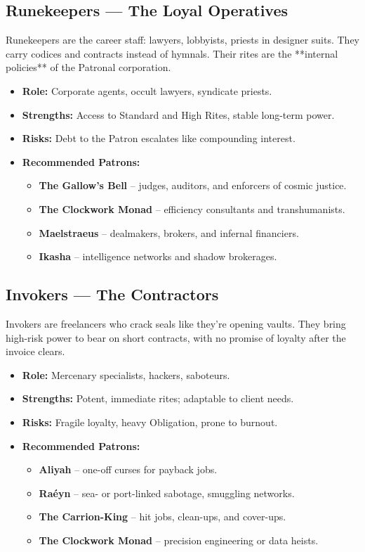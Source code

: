\documentclass[11pt]{article}
\begin{document}
\subsection*{Runekeepers --- The Loyal Operatives}
Runekeepers are the career staff: lawyers, lobbyists, priests in designer suits. They carry codices and contracts instead of hymnals. Their rites are the **internal policies** of the Patronal corporation.
\begin{itemize}
  \item \textbf{Role:} Corporate agents, occult lawyers, syndicate priests.
  \item \textbf{Strengths:} Access to Standard and High Rites, stable long-term power.
  \item \textbf{Risks:} Debt to the Patron escalates like compounding interest.
  \item \textbf{Recommended Patrons:}
    \begin{itemize}
      \item \textbf{The Gallow’s Bell} – judges, auditors, and enforcers of cosmic justice.
      \item \textbf{The Clockwork Monad} – efficiency consultants and transhumanists.
      \item \textbf{Maelstraeus} – dealmakers, brokers, and infernal financiers.
      \item \textbf{Ikasha} – intelligence networks and shadow brokerages.
    \end{itemize}
\end{itemize}

\subsection*{Invokers --- The Contractors}
Invokers are freelancers who crack seals like they’re opening vaults. They bring high-risk power to bear on short contracts, with no promise of loyalty after the invoice clears.
\begin{itemize}
  \item \textbf{Role:} Mercenary specialists, hackers, saboteurs.
  \item \textbf{Strengths:} Potent, immediate rites; adaptable to client needs.
  \item \textbf{Risks:} Fragile loyalty, heavy Obligation, prone to burnout.
  \item \textbf{Recommended Patrons:}
    \begin{itemize}
      \item \textbf{Aliyah} – one-off curses for payback jobs.
      \item \textbf{Raéyn} – sea- or port-linked sabotage, smuggling networks.
      \item \textbf{The Carrion-King} – hit jobs, clean-ups, and cover-ups.
      \item \textbf{The Clockwork Monad} – precision engineering or data heists.
    \end{itemize}
\end{itemize}
\end{document}
